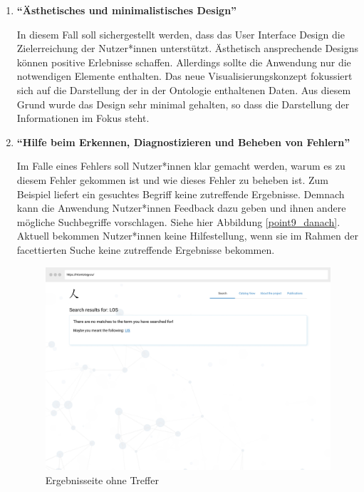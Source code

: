 \begin{enumerate}


\item \textbf{\enquote{Ästhetisches und minimalistisches Design}} \newline

In diesem Fall soll sichergestellt werden, dass das User Interface Design die Zielerreichung der Nutzer*innen unterstützt.
Ästhetisch ansprechende Designs können positive Erlebnisse schaffen. 
Allerdings sollte die Anwendung nur die notwendigen Elemente enthalten. 
Das neue Visualisierungskonzept fokussiert sich auf die Darstellung der in der Ontologie enthaltenen Daten.
Aus diesem Grund wurde das Design sehr minimal gehalten, so dass die Darstellung der Informationen im Fokus steht.


\item \textbf{\enquote{Hilfe beim Erkennen, Diagnostizieren und Beheben von Fehlern}} \newline

Im Falle eines Fehlers soll Nutzer*innen klar gemacht werden, warum es zu diesem Fehler gekommen ist und wie dieses Fehler zu beheben ist.
Zum Beispiel liefert ein gesuchtes Begriff keine zutreffende Ergebnisse.
Demnach kann die Anwendung Nutzer*innen Feedback dazu geben und ihnen andere mögliche Suchbegriffe vorschlagen.
Siehe hier Abbildung \ref{point9_danach}.
Aktuell bekommen Nutzer*innen keine Hilfestellung, wenn sie im Rahmen der facettierten Suche keine zutreffende Ergebnisse bekommen.

\begin{figure}[H]
	\centering
    	\includegraphics[width=1.45\textwidth, angle=-90]{Images/Mockup_Ergebnisseite_3}
   	\caption[Ergebnisseite ohne Treffer]{Ergebnisseite ohne Treffer}
   	\label{fig:point9_danach}
\end{figure}


\end{enumerate}
